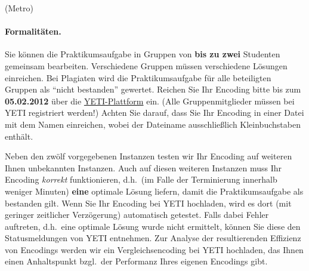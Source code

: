 \documentclass[a4paper,12pt,ngerman]{article}
\begin{document}
\begin{PraktikumsAufgabe}{2}{(Metro)}
\paragraph{Formalitäten.}
%
Sie können die Praktikumsaufgabe in Gruppen von \textbf{bis zu zwei} Studenten gemeinsam bearbeiten.
Verschiedene Gruppen müssen verschiedene Lösungen einreichen.
Bei Plagiaten wird die Praktikumsaufgabe für alle beteiligten Gruppen als ``nicht bestanden'' gewertet.
Reichen Sie Ihr Encoding bitte bis zum \textbf{05.02.2012}
über die \href{http://yeti.haiti.cs.uni-potsdam.de/student/showPractical.do?practicalId=29}{YETI-Plattform} ein.
(Alle Gruppenmitglieder müssen bei YETI registriert werden!)
Achten Sie darauf, dass Sie Ihr Encoding in einer Datei mit dem Namen  einreichen,
wobei der Dateiname ausschließlich Kleinbuchstaben enthält.

\noindent
Neben den zwölf vorgegebenen Instanzen
testen wir Ihr Encoding auf weiteren Ihnen unbekannten Instanzen.
Auch auf diesen weiteren Instanzen muss Ihr Encoding \emph{korrekt} funktionieren,
d.h.\ (im Falle der Terminierung innerhalb weniger Minuten) \textbf{eine} optimale Lösung liefern,
damit die Praktikumsaufgabe als bestanden gilt.
Wenn Sie Ihr Encoding bei YETI hochladen, wird es dort (mit geringer zeitlicher Verz\"ogerung)
automatisch getestet.
Falls dabei Fehler auftreten,
d.h.\ eine optimale Lösung wurde nicht ermittelt,
k\"onnen Sie diese den Statusmeldungen von YETI entnehmen.
Zur Analyse der resultierenden Effizienz von Encodings werden wir ein Vergleichsencoding 
bei YETI hochladen, das Ihnen einen Anhalts\-punkt bzgl.\ der Performanz Ihres
eigenen Encodings gibt.



\end{PraktikumsAufgabe}
\end{document}

